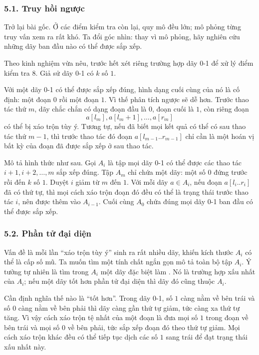 \documentclass[11pt]{article}
\begin{document}
\subsubsection*{5.1. Truy hồi ngược}

Trở lại bài gốc. Ở các điểm kiểm tra còn lại, quy mô đều lớn; mô phỏng từng
truy vấn xem ra rất khó. Ta đổi góc nhìn: thay vì mô phỏng, hãy nghiên cứu
những dãy ban đầu nào có thể được sắp xếp.

Theo kinh nghiệm vừa nêu, trước hết xét riêng trường hợp dãy 0-1 để xử lý
điểm kiểm tra 8. Giả sử dãy 0-1 có \(k\) số \(1\).

Với một dãy 0-1 có thể được sắp xếp đúng, hình dạng cuối cùng của nó là cố
định: một đoạn \(0\) rồi một đoạn \(1\). Vì thế phân tích ngược sẽ dễ hơn.
Trước thao tác thứ \(m\), dãy chắc chắn có dạng đoạn đầu là \(0\), đoạn cuối
là \(1\), còn riêng đoạn
\[
  a[l_m],a[l_m+1],\ldots,a[r_m]
\]
có thể bị xáo trộn tùy ý. Tương tự, nếu đã biết mọi kết quả có thể có sau
thao tác thứ \(m-1\), thì trước thao tác đó đoạn \(a[l_{m-1}..r_{m-1}]\) chỉ
cần là một hoán vị bất kỳ của đoạn đã được sắp xếp ở sau thao tác.

Mô tả hình thức như sau. Gọi \(A_i\) là tập mọi dãy 0-1 có thể được các thao
tác \(i+1,i+2,\ldots,m\) sắp xếp đúng. Tập \(A_m\) chỉ chứa một dãy: một số
\(0\) đứng trước rồi đến \(k\) số \(1\). Duyệt \(i\) giảm từ \(m\) đến \(1\).
Với mỗi dãy \(a\in A_i\), nếu đoạn \(a[l_i..r_i]\) đã có thứ tự, thì mọi cách
xáo trộn đoạn đó đều có thể là trạng thái trước thao tác \(i\), nên được thêm
vào \(A_{i-1}\). Cuối cùng \(A_0\) chứa đúng mọi dãy 0-1 ban đầu có thể được
sắp xếp.

\subsubsection*{5.2. Phần tử đại diện}

Vấn đề là mỗi lần ``xáo trộn tùy ý'' sinh ra rất nhiều dãy, khiến kích thước
\(A_i\) có thể là cấp số mũ. Ta muốn tìm một tính chất ngắn gọn mô tả toàn bộ
tập \(A_i\). Ý tưởng tự nhiên là tìm trong \(A_i\) một dãy đặc biệt làm
. Nó là trường hợp xấu nhất của \(A_i\); nếu một dãy
tốt hơn phần tử đại diện thì dãy đó cũng thuộc \(A_i\).

Cần định nghĩa thế nào là ``tốt hơn''. Trong dãy 0-1, số \(1\) càng nằm về
bên trái và số \(0\) càng nằm về bên phải thì dãy càng gần thứ tự giảm, tức
càng xa thứ tự tăng. Vì vậy cách xáo trộn tệ nhất của một đoạn là đưa mọi số
\(1\) trong đoạn về bên trái và mọi số \(0\) về bên phải, tức sắp xếp đoạn đó
theo thứ tự giảm. Mọi cách xáo trộn khác đều có thể tiếp tục dịch các số
\(1\) sang trái để đạt trạng thái xấu nhất này.
\end{document}
